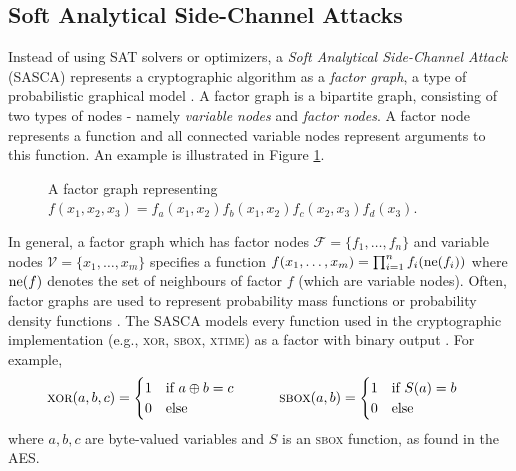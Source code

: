 \subsection{Soft Analytical Side-Channel Attacks}
\label{sec:sasca}
Instead of using SAT solvers or optimizers, a \textit{Soft Analytical Side-Channel Attack} (SASCA) represents a cryptographic algorithm as a \textit{factor graph}, a type of probabilistic graphical model \cite{sasca}. A factor graph is a bipartite graph, consisting of two types of nodes - namely \textit{variable nodes} and \textit{factor nodes}. A factor node represents a function and all connected variable nodes represent arguments to this function. An example is illustrated in Figure \ref{fig:example_factor_graph}.

\begin{figure}[ht]
    \begin{center}
    \scalebox{1.25}{
        
    }
    \end{center}
    \caption{A factor graph representing $f(x_1, x_2, x_3) = f_a(x_1, x_2) f_b(x_1, x_2) f_c(x_2, x_3) f_d(x_3)$.}
    \label{fig:example_factor_graph}
\end{figure}

In general, a factor graph which has factor nodes $\mathcal{F} = \{f_1,\dots,f_n\}$ and variable nodes $\mathcal{V} = \{x_1,\dots,x_m\}$ specifies a function $f(x_1,\dots,x_m) = \prod_{i=1}^n f_i(\operatorname{ne}(f_i))$ where $\operatorname{ne}(f)$ denotes the set of neighbours of factor $f$ (which are variable nodes). Often, factor graphs are used to represent probability mass functions or probability density functions \cite{fg_loeliger}.
The SASCA models every function used in the cryptographic implementation (e.g., \textsc{xor}, \textsc{sbox}, \textsc{xtime}) as a factor with binary output \cite{sasca}. For example,
\begin{equation}
    \textsc{xor}(a, b, c) = \begin{cases}
        1 \quad \text{if $a \oplus b = c$} \\
        0 \quad \text{else}
    \end{cases} \qquad
    \textsc{sbox}(a, b) = \begin{cases}
        1 \quad \text{if $S(a) = b$} \\
        0 \quad \text{else}
    \end{cases}
\end{equation}
where $a,b,c$ are byte-valued variables and $S$ is an \textsc{sbox} function, as found in the AES.

